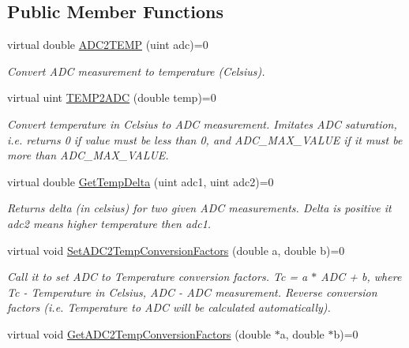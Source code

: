 \subsection*{Public Member Functions}
\begin{DoxyCompactItemize}
\item 
virtual double \hyperlink{class_interfaces_1_1_i_adc_temperature_convertor_aa6283c62cbbb012954b5e51d7a969385}{A\+D\+C2\+T\+E\+MP} (uint adc)=0
\begin{DoxyCompactList}\small\item\em Convert A\+DC measurement to temperature (Celsius). \end{DoxyCompactList}\item 
virtual uint \hyperlink{class_interfaces_1_1_i_adc_temperature_convertor_ab5d3453ecc41848b723a790fe7e01f79}{T\+E\+M\+P2\+A\+DC} (double temp)=0
\begin{DoxyCompactList}\small\item\em Convert temperature in Celsius to A\+DC measurement. Imitates A\+DC saturation, i.\+e. returns 0 if value must be less than 0, and A\+D\+C\+\_\+\+M\+A\+X\+\_\+\+V\+A\+L\+UE if it must be more than A\+D\+C\+\_\+\+M\+A\+X\+\_\+\+V\+A\+L\+UE. \end{DoxyCompactList}\item 
virtual double \hyperlink{class_interfaces_1_1_i_adc_temperature_convertor_a70d62425963cadadd88db1d7028bf722}{Get\+Temp\+Delta} (uint adc1, uint adc2)=0
\begin{DoxyCompactList}\small\item\em Returns delta (in celsius) for two given A\+DC measurements. Delta is positive it adc2 means higher temperature then adc1. \end{DoxyCompactList}\item 
virtual void \hyperlink{class_interfaces_1_1_i_adc_temperature_convertor_a3e4c9204b3593bc434a041c7a69c430f}{Set\+A\+D\+C2\+Temp\+Conversion\+Factors} (double a, double b)=0
\begin{DoxyCompactList}\small\item\em Call it to set A\+DC to Temperature conversion factors. Tc = a $\ast$ A\+DC + b, where Tc -\/ Temperature in Celsius, A\+DC -\/ A\+DC measurement. Reverse conversion factors (i.\+e. Temperature to A\+DC will be calculated automatically). \end{DoxyCompactList}\item 
virtual void \hyperlink{class_interfaces_1_1_i_adc_temperature_convertor_a61cff0aa0590906acfb18c9b789dceb2}{Get\+A\+D\+C2\+Temp\+Conversion\+Factors} (double $\ast$a, double $\ast$b)=0

\end{DoxyCompactItemize}
